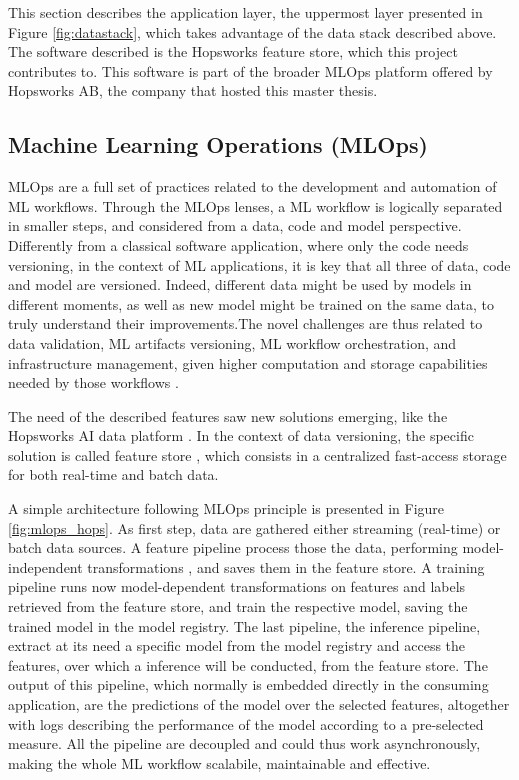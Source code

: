 This section describes the application layer, the uppermost layer presented in Figure \ref{fig:datastack}, which takes advantage of the data stack described above. The software described is the Hopsworks feature store, which this project contributes to. This software is part of the broader \gls{MLOps} platform offered by Hopsworks \gls{AB}, the company that hosted this master thesis.


\subsection{Machine Learning Operations (MLOps)}
\label{subsec:back_mlops}

\gls{MLOps} are a full set of practices related to the development and automation of \gls{ML} workflows. Through the \gls{MLOps} lenses, a \gls{ML} workflow is logically separated in smaller steps, and considered from a data, code and model perspective. Differently from a classical software application, where only the code needs versioning, in the context of \gls{ML} applications, it is key that all three of data, code and model are versioned. Indeed, different data might be used by models in different moments, as well as new model might be trained on the same data, to truly understand their improvements.The novel challenges are thus related to data validation, \gls{ML} artifacts versioning, \gls{ML} workflow orchestration, and infrastructure management, given higher computation and storage capabilities needed by those workflows \cite{SurgeAI2024,PDFBigData2024}.

The need of the described features saw new solutions emerging, like the Hopsworks AI data platform \cite{HopsworksRealtimeAI}. In the context of data versioning, the specific solution is called feature store \cite{MeetMichelangeloUbers2017}, which consists in a centralized fast-access storage for both real-time and batch data.

A simple architecture following \gls{MLOps} principle is presented in Figure \ref{fig:mlops_hops}. As first step, data are gathered either streaming (real-time) or batch data sources. A feature pipeline process those the data, performing model-independent transformations \cite{BigDictionaryMLOps2024}, and saves them in the feature store. A training pipeline runs now model-dependent transformations on features and labels retrieved from the feature store, and train the respective model, saving the trained model in the model registry. The last pipeline, the inference pipeline, extract at its need a specific model from the model registry and access the features, over which a inference will be conducted, from the feature store. The output of this pipeline, which normally is embedded directly in the consuming application, are the predictions of the model over the selected features, altogether with logs describing the performance of the model according to a pre-selected measure. All the pipeline are decoupled and could thus work asynchronously, making the whole \gls{ML} workflow scalabile, maintainable and effective.

